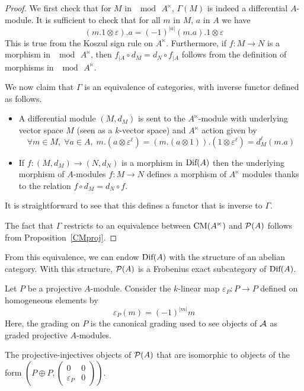 \documentclass[12pt]{article}
\begin{document}
	\begin{proof}
		We first check that for $M$ in $\mod \, A^\ltimes$, $\Gamma(M)$ is indeed a differential $A$-module. It is sufficient to check that for all $m$ in $M$, $a$ in $A$ we have
		\[(m.1\otimes \varepsilon).a = (-1)^{|a|} (m.a).1 \otimes \varepsilon\] 
		This is true from the Koszul sign rule on $A^\ltimes$. 
		Furthermore, if $f: M \to N$ is a morphism in $\mod \, A^\ltimes$, then $f_{|A} \circ d_M = d_N \circ f_{|A}$ follows from the definition of morphisms in $\mod \, A^\ltimes$. 	
		
		\noindent We now claim that $\Gamma$ is an equivalence of categories, with inverse functor defined as follows.
		\begin{itemize}
			\item A differential module $(M,d_M)$ is sent to the $A^\ltimes$-module with underlying vector space $M$ (seen as a $k$-vector space) and $A^\ltimes$ action given by
			\[\forall m \in M, \; \forall a \in A, \; m.(a \otimes \varepsilon^\ell) = (m.(a \otimes 1)).(1 \otimes \varepsilon^\ell) = d_M^\ell(m.a)\]
			\item If $f:(M,d_M) \to (N,d_N)$ is a morphism in $\textup{Dif}(A)$ then the underlying morphism of $A$-modules $f: M \to N$ defines a morphism of $A^\ltimes$ modules thanks to the relation $f \circ d_M = d_N \circ f$.
		\end{itemize}
		It is straightforward to see that this defines a functor that is inverse to $\Gamma$.
		
		The fact that $\Gamma$ restricts to an equivalence between $\textup{CM}(A^\ltimes)$ and ${\cal{P}}(A)$ follows from Proposition~\ref{CMproj}.
	\end{proof}
	
	From this equivalence, we can endow $\textup{Dif}(A)$ with the structure of an abelian category. With this structure, ${\cal{P}}(A)$ is a Frobenius exact subcategory of $\textup{Dif}(A)$.
	
	\begin{definition}
		Let $P$ be a projective $A$-module. Consider the $k$-linear map $\varepsilon_P: P \to P$ defined on homogeneous elements by
		\[\varepsilon_P(m) = (-1)^{|m|}m\]
		Here, the grading on $P$ is the canonical grading used to see objects of ${\cal{A}}$ as graded projective $A$-modules.
	\end{definition}
	
	\begin{corollary}
		The projective-injectives objects of ${\cal{P}}(A)$ that are isomorphic to objects of the form $(P\oplus P, \begin{pmatrix}
			0 & 0 \\
			\varepsilon_P & 0
		\end{pmatrix}).$
	\end{corollary}
	
\end{document}

